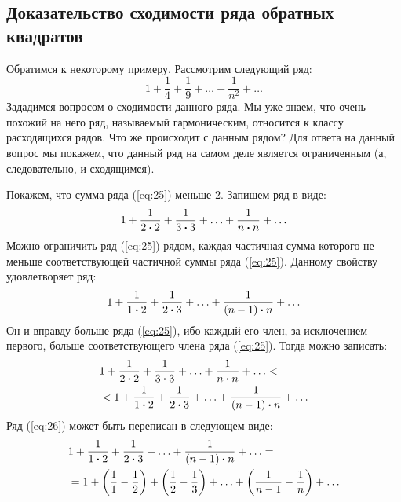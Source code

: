 \documentclass[12pt]{article}
\begin{document}
\subsection{Доказательство сходимости ряда обратных квадратов}
Обратимся к некоторому примеру. Рассмотрим следующий ряд:
\begin{equation}\label{eq:25}
    1 + \dfrac{1}{4} + \dfrac{1}{9} + \ldots + \dfrac{1}{n^2} + \ldots
\end{equation}
Зададимся вопросом о сходимости данного ряда. Мы уже знаем, что очень похожий на него ряд, называемый гармоническим, относится к классу расходящихся рядов. Что же происходит с данным рядом? Для ответа на данный вопрос мы покажем, что данный ряд на самом деле является ограниченным (а, следовательно, и сходящимся). 
\par
Покажем, что сумма ряда (\ref{eq:25}) меньше $2$. Запишем ряд в виде:
\begin{equation}
    1 + \dfrac{1}{2\vdot 2} + \dfrac{1}{3\vdot 3} + \ldots + \dfrac{1}{n\vdot n} + \ldots
\end{equation}
Можно ограничить ряд (\ref{eq:25}) рядом, каждая частичная сумма которого не меньше соответствующей частичной суммы ряда (\ref{eq:25}). Данному свойству удовлетворяет ряд:
\begin{equation}\label{eq:26}
    1 + \dfrac{1}{1\vdot2} + \dfrac{1}{2\vdot3} + \ldots + \dfrac{1}{\qty(n-1)\vdot n} + \ldots
\end{equation}
Он и вправду больше ряда (\ref{eq:25}), ибо каждый его член, за исключением первого, больше соответствующего члена ряда (\ref{eq:25}). Тогда можно записать:
\begin{equation}
\begin{split}
        &1 + \dfrac{1}{2\vdot 2} + \dfrac{1}{3\vdot 3} + \ldots + \dfrac{1}{n\vdot n} + \ldots <\\
        &< 1 + \dfrac{1}{1\vdot2} + \dfrac{1}{2\vdot3} + \ldots + \dfrac{1}{\qty(n-1)\vdot n} + \ldots
\end{split}
\end{equation}
Ряд (\ref{eq:26}) может быть переписан в следующем виде:
\begin{equation}
\begin{split}
        &1 + \dfrac{1}{1\vdot2} + \dfrac{1}{2\vdot3} + \ldots + \dfrac{1}{\qty(n-1)\vdot n} + \ldots =\\
    & = 1 + \qty(\dfrac{1}{1} - \dfrac{1}{2}) + \qty(\dfrac{1}{2}  - \dfrac{1}{3}) + \ldots +\qty(\dfrac{1}{n-1} - \dfrac{1}{n}) + \ldots
\end{split}
\end{equation}
\end{document}
